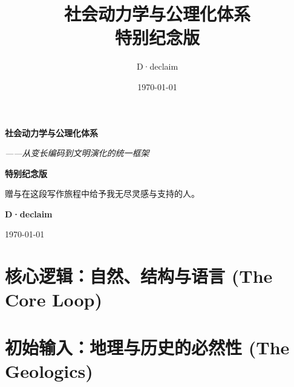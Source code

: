 \documentclass[openany, a4paper, 12pt]{book}
\title{\textbf{社会动力学与公理化体系}\\ \large 特别纪念版}
\author{D·declaim}
\date{\today}
\begin{document}
	\begin{titlepage}
		\centering
		\vspace*{4cm}
		
		{\Huge \textbf{社会动力学与公理化体系} \par}
		\vspace{1.5cm}
		{\Large \textit{——从变长编码到文明演化的统一框架} \par}
		
		\vspace{3cm}
		
		{\Large \textbf{特别纪念版} \par}
		\vspace{1cm}
		{\large 赠与在这段写作旅程中给予我无尽灵感与支持的人。\par}
		
		\vfill
		
		{\large \textbf{D·declaim} \par}
		{\large \today \par}
	\end{titlepage}

	\maketitle      %
	
	\frontmatter
	
	\tableofcontents %
	
	\mainmatter     %

	
	

	\part{核心逻辑：自然、结构与语言 (The Core Loop)}
	
	
	
	
	\part{初始输入：地理与历史的必然性 (The Geologics)}
	
	
	
\end{document}
